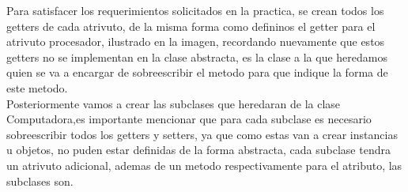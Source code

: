 \documentclass[12pt]{article}
\begin{document}
Para satisfacer los requerimientos solicitados en la practica, se crean todos los getters de cada atrivuto, de la misma forma como defininos el getter para el atrivuto procesador, ilustrado en la imagen, recordando nuevamente que estos getters no se implementan en la clase abstracta, es la clase a la que heredamos quien se va a encargar de sobreescribir el metodo para que indique la forma de este metodo.\\
Posteriormente vamos a crear las subclases que heredaran de la clase Computadora,es importante mencionar que para cada subclase es necesario sobreescribir todos los getters y setters, ya que como estas van a  crear instancias u objetos, no puden estar definidas de la forma abstracta, cada subclase tendra un atrivuto adicional, ademas de un metodo respectivamente para el atributo, las subclases son.\\
\end{document}
